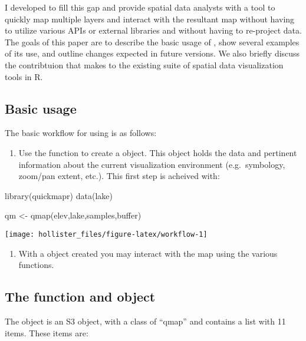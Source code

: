 I developed  to fill this gap and provide spatial
data analysts with a tool to quickly map multiple layers and interact
with the resultant map without having to utilize various APIs or
external libraries and without having to re-project data. The goals of
this paper are to describe the basic usage of , show
several examples of its use, and outline changes expected in future
versions. We also briefly discuss the contribtuion that 
makes to the existing suite of spatial data visualization tools in R.

\subsection{Basic usage}\label{basic-usage}

The basic workflow for using  is as follows:

\begin{enumerate}
\def\labelenumi{\arabic{enumi}.}
\tightlist
\item
  Use the  function to create a  object. This
  object holds the data and pertinent information about the current
  visualization environment (e.g.~symbology, zoom/pan extent, etc.).
  This first step is acheived with:
\end{enumerate}

\begin{Schunk}
\begin{Sinput}
library(quickmapr)
data(lake)

qm <- qmap(elev,lake,samples,buffer)
\end{Sinput}

\texttt{[image: hollister\_files/figure-latex/workflow-1]} \end{Schunk}

\begin{enumerate}
\def\labelenumi{\arabic{enumi}.}
\setcounter{enumi}{1}
\tightlist
\item
  With a  object created you may interact with the map using
  the various  functions.
\end{enumerate}

\subsection{\texorpdfstring{The  function and
object}{The  function and object}}\label{the-function-and-object}

The  object is an S3 object, with a class of ``qmap'' and
contains a list with 11 items. These items are:

